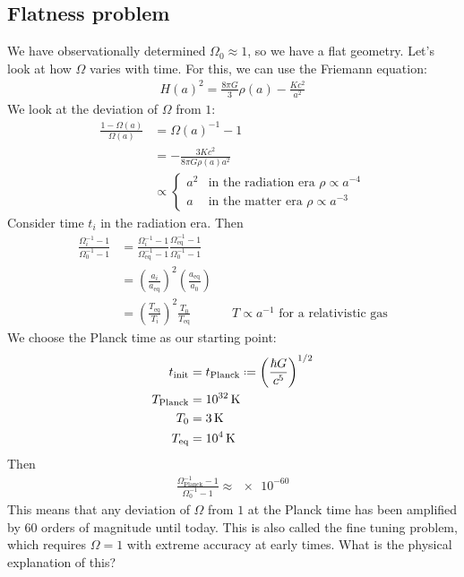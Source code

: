 \subsection{Flatness problem}
We have observationally determined $\Omega_0 \approx 1$, so we have a flat geometry. Let's look at how $\Omega$ varies with time. For this, we can use the Friemann equation:
\begin{align*}
	H(a)^2 = \frac{8\pi G}{3} \rho(a) - \frac{Kc^2}{a^2}
\end{align*}
We look at the deviation of $\Omega$ from $1$:
\begin{align*}
	\frac{1 - \Omega(a)}{\Omega(a)}
	&= \Omega(a)^{-1} - 1\\
	&= -\frac{3Kc^2}{8\pi G \rho(a)a^2}\\
	&\propto
	\begin{cases}
		a^2 &\text{in the radiation era } \rho \propto a^{-4}\\
		a & \text{in the matter era } \rho \propto a^{-3}
	\end{cases}
\end{align*}
Consider time $t_i$ in the radiation era. Then
\begin{align*}
	\frac{\Omega_i^{-1} - 1}{\Omega_0^{-1} - 1}
	&= \frac{\Omega_i^{-1} - 1}{\Omega_\text{eq}^{-1} -1}
	\frac{\Omega_\text{eq}^{-1}-1}{\Omega_0^{-1}-1}\\
	&= 
	\left( \frac{a_i}{a_\text{eq}} \right)^2 
	\left( \frac{a_\text{eq}}{a_0} \right)\\
	&= \left( \frac{T_\text{eq}}{T_i} \right)^2
	\frac{T_0}{T_\text{eq}}
	&& T \propto a^{-1} \text{ for a relativistic gas}
\end{align*}
We choose the Planck time as our starting point:
\begin{align*}
	t_\text{init} &= t_\text{Planck}
	\defeq 
	\left( \frac{\hbar G}{c^5} \right)^{1/2}\\
	T_\text{Planck} &= \SI{e32}{\kelvin}\\
	T_0 &= \SI{3}{\kelvin}\\
	T_\text{eq} &= \SI{e4}{\kelvin} 
\end{align*}
Then
\begin{align*}
	\frac{\Omega_\text{Planck}^{-1} - 1}{\Omega_0^{-1}-1} \approx \num{e-60}
\end{align*}
This means that any deviation of $\Omega$ from $1$ at the Planck time has been amplified by $60$ orders of magnitude until today. This is also called the fine tuning problem, which requires $\Omega=1$ with extreme accuracy at early times. What is the physical explanation of this?


